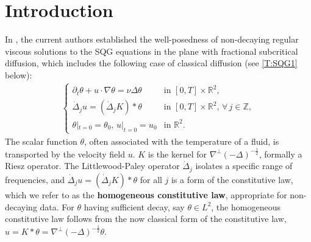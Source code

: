 \documentclass[11pt,reqno,xcolor=svgnames]{amsart}
\def\R{{\mathbb R}}
\def\Z{{\mathbb Z}}
\theoremstyle{plain}
\theoremstyle{definition}
\theoremstyle{plain}
\theoremstyle{remark}
\newcommand{\grad}{\ensuremath{\nabla}}
\newcommand{\prt}{\ensuremath{\partial}}
\newcommand{\Del}{\dot{\Delta}}
\begin{document}
\maketitle


\tableofcontents


\section{Introduction}




    \noindent In \cite{AACK25}, the current authors established the well-posedness of non-decaying regular viscous solutions to the SQG equations in the plane with fractional subcritical diffusion, which includes the following case of classical diffusion (see \cref{T:SQG1} below):
    \begin{align}\label{e:SQGnu}
        \tag{$SQG_\nu$}
        \begin{cases}
            \prt_t \theta + u\cdot\grad\theta = \nu \Delta\theta
                &\text{in }[0,T] \times \R^2,\\
            \Del_j u = (\Del_j K) *\theta
                &\text{in } [0,T]\times \R^2, \, \forall\,j\in\Z,\\
            \theta|_{t = 0} = \theta_0, \, u|_{t = 0} = u_0
                &\text{in }\R^2.
        \end{cases}
    \end{align}
    The scalar function $\theta$, often associated with the temperature of a fluid, is transported by the velocity field $u$. $K$ is the kernel for $\grad^\perp (-\Delta)^{-\frac{1}{2}}$, formally a Riesz operator. The Littlewood-Paley operator $\Del_j$ isolates a specific range of frequencies, and $\Del_j u = (\Del_j K) *\theta$ for all $j$ is a form of the constitutive law, which we refer to as the \textbf{homogeneous constitutive law}, appropriate for non-decaying data. For $\theta$ having sufficient decay, say $\theta \in L^2$, the homogeneous constitutive law follows from the now classical form of the constitutive law, $u = K * \theta = \grad^\perp (-\Delta)^{-\frac{1}{2}} \theta$.
\end{document}

